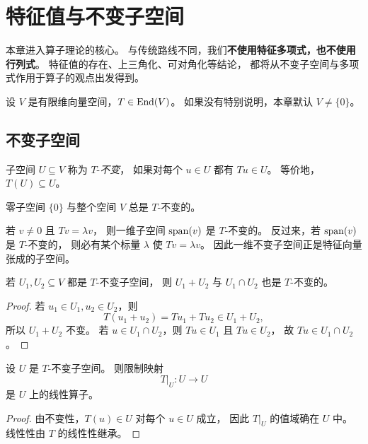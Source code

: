 \chapter{特征值与不变子空间}

本章进入算子理论的核心。
与传统路线不同，我们\textbf{不使用特征多项式，也不使用行列式}。
特征值的存在、上三角化、可对角化等结论，
都将从不变子空间与多项式作用于算子的观点出发得到。

设 $V$ 是有限维向量空间，$T\in\mathrm{End}(V)$。
如果没有特别说明，本章默认 $V\neq\{0\}$。

\section{不变子空间}

\begin{definition}
子空间 $U\subseteq V$ 称为 $T$-\emph{不变}，
如果对每个 $u\in U$ 都有 $Tu\in U$。
等价地，$T(U)\subseteq U$。
\end{definition}

\begin{example}
零子空间 $\{0\}$ 与整个空间 $V$ 总是 $T$-不变的。
\end{example}

\begin{example}
若 $v\neq 0$ 且 $Tv=\lambda v$，
则一维子空间 $\operatorname{span}(v)$ 是 $T$-不变的。
反过来，若 $\operatorname{span}(v)$ 是 $T$-不变的，
则必有某个标量 $\lambda$ 使 $Tv=\lambda v$。
因此一维不变子空间正是特征向量张成的子空间。
\end{example}

\begin{proposition}
若 $U_1,U_2\subseteq V$ 都是 $T$-不变子空间，
则 $U_1+U_2$ 与 $U_1\cap U_2$ 也是 $T$-不变的。
\end{proposition}

\begin{proof}
若 $u_1\in U_1,u_2\in U_2$，则
\[
T(u_1+u_2)=Tu_1+Tu_2\in U_1+U_2,
\]
所以 $U_1+U_2$ 不变。
若 $u\in U_1\cap U_2$，则 $Tu\in U_1$ 且 $Tu\in U_2$，
故 $Tu\in U_1\cap U_2$。
\end{proof}

\begin{proposition}
设 $U$ 是 $T$-不变子空间。
则限制映射
\[
T|_U:U\to U
\]
是 $U$ 上的线性算子。
\end{proposition}

\begin{proof}
由不变性，$T(u)\in U$ 对每个 $u\in U$ 成立，
因此 $T|_U$ 的值域确在 $U$ 中。
线性性由 $T$ 的线性性继承。
\end{proof}

